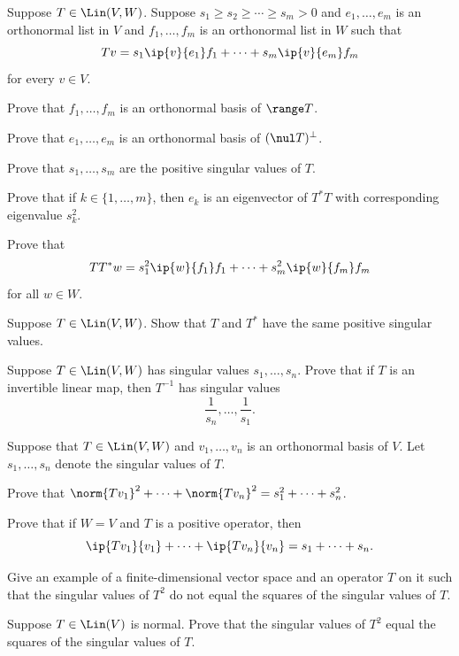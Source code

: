 \begin{exercise}
Suppose $T\in\Lin(V,W)$. Suppose $s_1\ge s_2\ge\cdots\ge s_m>0$ and
$e_1,\dots,e_m$ is an orthonormal list in $V$ and $f_1,\dots,f_m$ is an
orthonormal list in $W$ such that
\[ Tv = s_1\ip{v}{e_1}f_1+\cdots+s_m\ip{v}{e_m}f_m \]
for every $v\in V$.
\begin{parts}
\item Prove that $f_1,\dots,f_m$ is an orthonormal basis of $\range T$.
\item Prove that $e_1,\dots,e_m$ is an orthonormal basis of $(\nul T)^\perp$.
\item Prove that $s_1,\dots,s_m$ are the positive singular values of $T$.
\item Prove that if $k\in\{1,\dots,m\}$, then $e_k$ is an eigenvector of
  $T^*T$ with corresponding eigenvalue $s_k^2$.
\item Prove that
  \[ TT^*w = s_1^2\ip{w}{f_1}f_1+\cdots+s_m^2\ip{w}{f_m}f_m \]
  for all $w\in W$.
\end{parts}
\end{exercise}

\begin{exercise}
Suppose $T\in\Lin(V,W)$. Show that $T$ and $T^*$ have the same positive
singular values.
\end{exercise}

\begin{exercise}
Suppose $T\in\Lin(V,W)$ has singular values $s_1,\dots,s_n$. Prove that if $T$
is an invertible linear map, then $T^{-1}$ has singular values
\[ \frac{1}{s_n},\dots,\frac{1}{s_1}. \]
\end{exercise}

\begin{exercise}
Suppose that $T\in\Lin(V,W)$ and $v_1,\dots,v_n$ is an orthonormal basis of
$V$. Let $s_1,\dots,s_n$ denote the singular values of $T$.
\begin{parts}
\item Prove that $\norm{Tv_1}^2+\cdots+\norm{Tv_n}^2=s_1^2+\cdots+s_n^2$.
\item Prove that if $W=V$ and $T$ is a positive operator, then
  \[ \ip{Tv_1}{v_1}+\cdots+\ip{Tv_n}{v_n} = s_1+\cdots+s_n. \]
\end{parts}
\end{exercise}

\begin{exercise}\leavevmode
\begin{parts}
\item Give an example of a finite-dimensional vector space and an operator $T$
  on it such that the singular values of $T^2$ do not equal the squares of the
  singular values of $T$.
\item Suppose $T\in\Lin(V)$ is normal. Prove that the singular values of $T^2$
  equal the squares of the singular values of $T$.
\end{parts}
\end{exercise}

